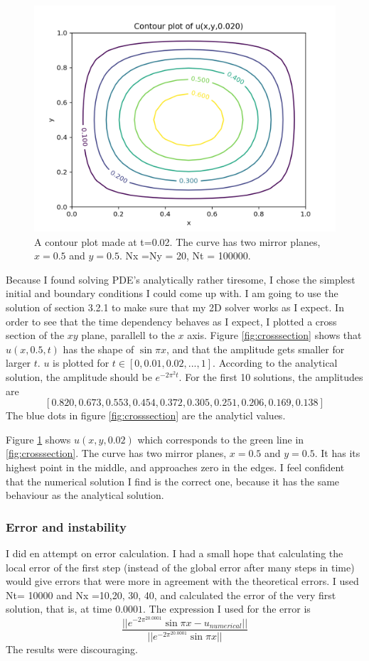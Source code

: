 \documentclass{article}
\begin{document}
\begin{figure}
  \includegraphics[width=\linewidth]{contoursine.png}
  \caption{A contour plot made at t=0.02. The curve has two mirror planes, $x=0.5$ and $y=0.5$. Nx =Ny = 20, Nt = 100000.}
  \label{fig:contoursine}
\end{figure} 
Because I found solving PDE's analytically rather tiresome, I chose the simplest initial and boundary conditions I could come up with. I am going to use the solution of section 3.2.1 to make sure that my 2D solver works as I expect. In order to see that the time dependency behaves as I expect, I plotted a cross section of the $xy$ plane, parallell to the $x$ axis. Figure \ref{fig:crosssection} shows that $u(x,0.5,t)$ has the shape of $\sin \pi x$, and that the amplitude gets smaller for larger $t$. $u$ is plotted for $t \in [0,0.01, 0.02, ... , 1]$.  According to the analytical solution, the amplitude should be $e^{-2\pi^2 t}$. For the first 10 solutions, the amplitudes are $$[  0.820,  0.673,  0.553,  0.454,
        0.372,  0.305,  0.251,  0.206,  0.169,  0.138]$$ The blue dots in figure \ref{fig:crosssection} are the analyticl values.  

Figure \ref{fig:contoursine} shows $u(x,y,0.02)$ which corresponds to the green line in \ref{fig:crosssection}. The curve has two mirror planes, $x=0.5$ and $y=0.5$. It has its highest point in the middle, and approaches zero in the edges. I feel confident that the numerical solution I find is the correct one, because it has the same behaviour as the analytical solution.
\subsubsection{Error and instability}
I did en attempt on error calculation. I had a small hope that calculating the local error of the first step (instead of the global error after many steps in time) would give errors that were more in agreement with the theoretical errors.  I used Nt= 10000 and Nx =10,20, 30, 40, and calculated the error of the very first solution, that is, at time $0.0001$. The expression I used for the error is $$\frac{||e^{-2\pi^20.0001}\sin\pi x-u_{numerical}||}{||e^{-2\pi^20.0001}\sin\pi x||}$$ The results were discouraging. 
\end{document}

